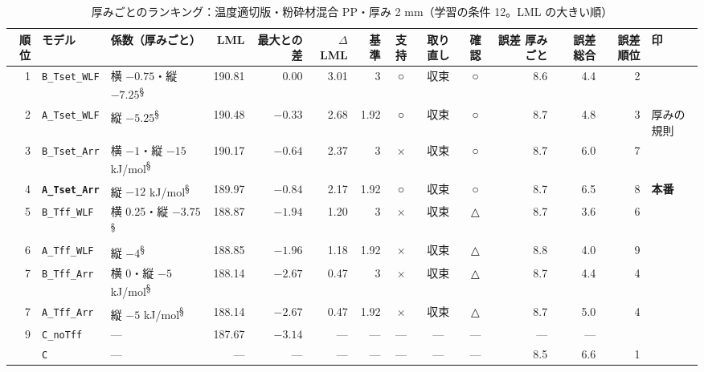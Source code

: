 \documentclass[paper=a4paper,landscape,fontsize=10pt,line_length=62zw,number_of_lines=34]{jlreq}
\let\origtextbf\textbf
\renewcommand{\textbf}[1]{\origtextbf{\gtfamily #1}}   %
\begin{document}
\begin{table}[H]\centering\footnotesize
\caption{厚みごとのランキング：温度適切版・粉砕材混合 PP・厚み 2 mm（学習の条件 12。LML の大きい順）}
\begin{tabular}{rlp{11\zw}rrrrccc rrrl}
\toprule
順位 & モデル & 係数（厚みごと） & LML & 最大との差 & $\Delta$LML & 基準 & 支持 & 取り直し & 確認 & 誤差 厚みごと & 誤差 総合 & 誤差順位 & 印 \\
\midrule
1 & \texttt{B\_\allowbreak{}Tset\_\allowbreak{}WLF} & 横 $-0.75$・縦 $-7.25$\textsuperscript{§} & 190.81 & 0.00 & 3.01 & 3 & ○ & 収束 & ○ & 8.6 & 4.4 & 2 &  \\
2 & \texttt{A\_\allowbreak{}Tset\_\allowbreak{}WLF} & 縦 $-5.25$\textsuperscript{§} & 190.48 & $-0.33$ & 2.68 & 1.92 & ○ & 収束 & ○ & 8.7 & 4.8 & 3 & 厚みの規則 \\
3 & \texttt{B\_\allowbreak{}Tset\_\allowbreak{}Arr} & 横 $-1$・縦 $-15$ kJ/mol\textsuperscript{§} & 190.17 & $-0.64$ & 2.37 & 3 & × & 収束 & ○ & 8.7 & 6.0 & 7 &  \\
4 & \textbf{\texttt{A\_\allowbreak{}Tset\_\allowbreak{}Arr}} & 縦 $-12$ kJ/mol\textsuperscript{§} & 189.97 & $-0.84$ & 2.17 & 1.92 & ○ & 収束 & ○ & 8.7 & 6.5 & 8 & \textbf{本番} \\
5 & \texttt{B\_\allowbreak{}Tff\_\allowbreak{}WLF} & 横 0.25・縦 $-3.75$\textsuperscript{§} & 188.87 & $-1.94$ & 1.20 & 3 & × & 収束 & △ & 8.7 & 3.6 & 6 &  \\
6 & \texttt{A\_\allowbreak{}Tff\_\allowbreak{}WLF} & 縦 $-4$\textsuperscript{§} & 188.85 & $-1.96$ & 1.18 & 1.92 & × & 収束 & △ & 8.8 & 4.0 & 9 &  \\
7 & \texttt{B\_\allowbreak{}Tff\_\allowbreak{}Arr} & 横 0・縦 $-5$ kJ/mol\textsuperscript{§} & 188.14 & $-2.67$ & 0.47 & 3 & × & 収束 & △ & 8.7 & 4.4 & 4 &  \\
7 & \texttt{A\_\allowbreak{}Tff\_\allowbreak{}Arr} & 縦 $-5$ kJ/mol\textsuperscript{§} & 188.14 & $-2.67$ & 0.47 & 1.92 & × & 収束 & △ & 8.7 & 5.0 & 4 &  \\
9 & \texttt{C\_\allowbreak{}noTff} & --- & 187.67 & $-3.14$ & --- & --- & --- & --- & --- & --- & --- &  &  \\
 & \texttt{C} & --- & --- & --- & --- & --- & --- & --- & --- & 8.5 & 6.6 & 1 &  \\
\bottomrule
\end{tabular}
\end{table}
\end{document}
